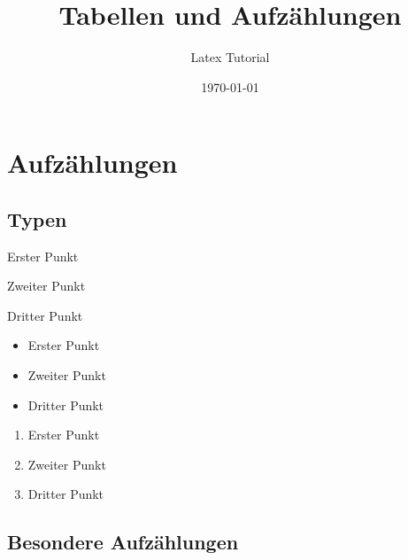 \documentclass[a4paper,10pt]{scrartcl}
\title{Tabellen und Aufzählungen}
\author{Latex Tutorial}
\date{\today}
\begin{document}
\maketitle
\tableofcontents
\newpage

\section{Aufzählungen}
		
\subsection{Typen}

\begin{description}
\item{Erster Punkt}
\item{Zweiter Punkt}
\item{Dritter Punkt}
\end{description}

\begin{itemize}
\item{Erster Punkt}
\item{Zweiter Punkt}
\item{Dritter Punkt}
\end{itemize}
		
\begin{enumerate}
\item{Erster Punkt}
\item{Zweiter Punkt}
\item{Dritter Punkt}
\end{enumerate}

\subsection{Besondere Aufzählungen}

%
\end{document}
